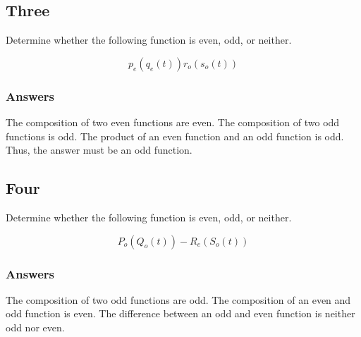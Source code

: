 \documentclass{article}
\begin{document}
\subsection*{Three}

Determine whether the following function is even, odd, or neither.

$$p_e\left(q_e\left(t\right)\right)r_o\left(s_o\left(t\right)\right)$$
\subsubsection*{Answers}

The composition of two even functions are even. The composition of two odd functions is odd. The product of an even function and an odd function is odd.
Thus, the answer must be an odd function.

\subsection*{Four}

Determine whether the following function is even, odd, or neither.

$$ P_o\left(Q_o\left(t\right)\right)-R_e\left(S_o\left(t\right)\right) $$

\subsubsection*{Answers}

The composition of two odd functions are odd. The composition of an even and odd function is even. The difference between an odd and even function is neither odd nor even.
\end{document}
